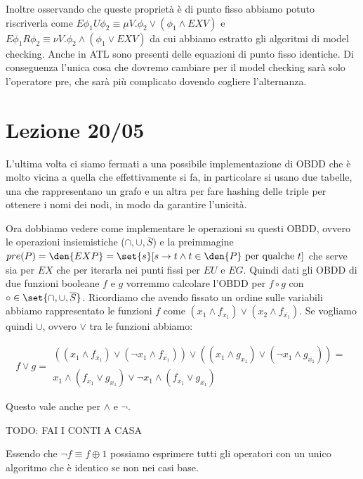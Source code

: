 Inoltre osservando che queste proprietà è di punto fisso abbiamo potuto riscriverla come \(E \phi_1 U \phi_2 \equiv \mu V. \phi_2 \lor (\phi_1 \land EX V)\) e \(E \phi_1 R \phi_2 \equiv \nu V. \phi_2 \land (\phi_1 \lor EX V)\) da cui abbiamo estratto gli algoritmi di model checking. Anche in ATL sono presenti delle equazioni di punto fisso identiche. Di conseguenza l'unica cosa che dovremo cambiare per il model checking sarà solo l'operatore pre, che sarà più complicato dovendo cogliere l'alternanza.

\chapter{Lezione 20/05}

L'ultima volta ci siamo fermati a una possibile implementazione di OBDD che è molto vicina a quella che effettivamente si fa, in particolare si usano due tabelle, una che rappresentano un grafo e un altra per fare hashing delle triple per ottenere i nomi dei nodi, in modo da garantire l'unicità.

Ora dobbiamo vedere come implementare le operazioni su questi OBDD, ovvero le operazioni insiemistiche (\(\cap, \cup, \overline{S}\)) e la preimmagine \(pre(P) = \den{EXP} = \set{s}[s\to t \land t \in \den{P} \text{ per qualche }t]\) che serve sia per \(EX\) che per iterarla nei punti fissi per \(EU\) e \(EG\). Quindi dati gli OBDD di due funzioni booleane \(f\) e \(g\) vorremmo calcolare l'OBDD per \(f \circ g\) con \(\circ \in \set{\cap, \cup, \overline{S}}\). Ricordiamo che avendo fissato un ordine sulle variabili abbiamo rappresentato le funzioni \(f\) come \((x_1 \land f_{x_1}) \lor (x_2 \land f_{\overline{x_1}})\). Se vogliamo quindi \(\cup\), ovvero \(\lor\) tra le funzioni abbiamo: 


\begin{equation*}
  f \lor g = \begin{aligned}
    ((x_1 \land f_{x_1}) \lor (\neg x_1 \land f_{\overline{x_1}})) \lor ((x_1 \land g_{x_1}) \lor (\neg x_1 \land g_{\overline{x_1}})) = \\
    x_1 \land (f_{x_1} \lor g_{x_1}) \lor \neg x_1 \land (f_{\overline{x_1}} \lor g_{\overline{x_1}})
    \end{aligned}
\end{equation*}

Questo vale anche per \(\land\) e \(\neg\). 

TODO: FAI I CONTI A CASA 

Essendo che \(\neg f \equiv f \oplus 1\) possiamo esprimere tutti gli operatori con un unico algoritmo che è identico se non nei casi base.

